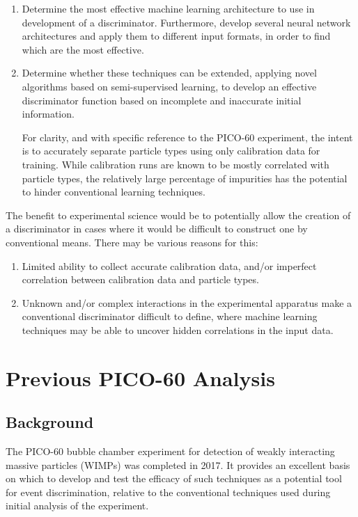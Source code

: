\documentclass[10pt]{article}
\begin{document}
\begin{enumerate}
    \item Determine the most effective machine learning architecture to use in development of a discriminator. Furthermore, develop several neural network architectures and apply them to different input formats, in order to find which are the most effective.

    \item Determine whether these techniques can be extended, applying novel algorithms based on semi-supervised learning, to develop an effective discriminator function based on incomplete and inaccurate initial information.
    
    For clarity, and with specific reference to the PICO-60 experiment, the intent is to accurately separate particle types using only calibration data for training. While calibration runs are known to be mostly correlated with particle types, the relatively large percentage of impurities has the potential to hinder conventional learning techniques.
\end{enumerate}

The benefit to experimental science would be to potentially allow the creation of a discriminator in cases where it would be difficult to construct one by conventional means. There may be various reasons for this:

\begin{enumerate}
    \item Limited ability to collect accurate calibration data, and/or imperfect correlation between calibration data and particle types.
    \item Unknown and/or complex interactions in the experimental apparatus make a conventional discriminator difficult to define, where machine learning techniques may be able to uncover hidden correlations in the input data.
\end{enumerate}

\section{Previous PICO-60 Analysis}

\subsection{Background}

The PICO-60 bubble chamber experiment for detection of weakly interacting massive particles (WIMPs) \cite{pico} was completed in 2017. It provides an excellent basis on which to develop and test the efficacy of such techniques as a potential tool for event discrimination, relative to the conventional techniques used during initial analysis of the experiment.
\end{document}
